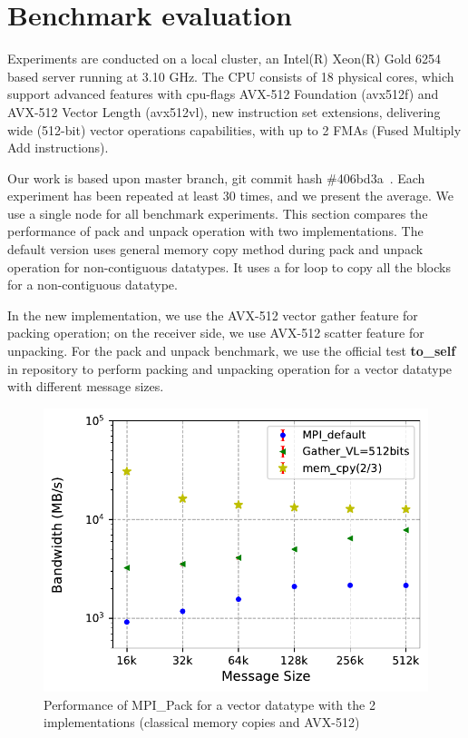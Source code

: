 \documentclass[conference]{IEEEtran}
\begin{document}
\section{Benchmark evaluation}\label{sec:experiments}
Experiments are conducted on a local cluster, an Intel(R) Xeon(R) Gold 6254 based server running
at 3.10 GHz. The CPU consists of 18 physical cores, which support advanced features with cpu-flags  AVX-512 Foundation (avx512f) and AVX-512 Vector Length (avx512vl), new instruction set extensions, delivering wide (512-bit) vector operations capabilities,
with up to 2 FMAs (Fused Multiply Add instructions).

Our work is based upon \ompi master branch, git commit hash \#406bd3a~\cite{ompigit}. Each experiment
has been repeated at least 30 times, and we present the average.  We use a single node for all benchmark experiments.
This section compares the performance of \mpi pack and unpack operation with two implementations.
The \ompi default version uses general memory copy method during pack and unpack operation for non-contiguous datatypes.
It uses a for loop to copy all the blocks for a non-contiguous datatype.

In the new implementation, we use the AVX-512 vector gather feature
for packing operation; on the receiver side, we use AVX-512 scatter feature for unpacking.
For the pack and unpack benchmark, we use the official test \textbf{to\_self} in \ompi repository
to perform packing and unpacking operation for a vector datatype with different message sizes.

\begin{figure}[h]
    \centering
    \includegraphics[width=\linewidth]{to_self_avx_gather_20tests_with_memcpy.pdf}
    \caption{Performance of MPI\_Pack for a vector datatype with the 2 implementations (classical memory copies and AVX-512)}
    \label{fig:gather20}
\end{figure}
\end{document}
